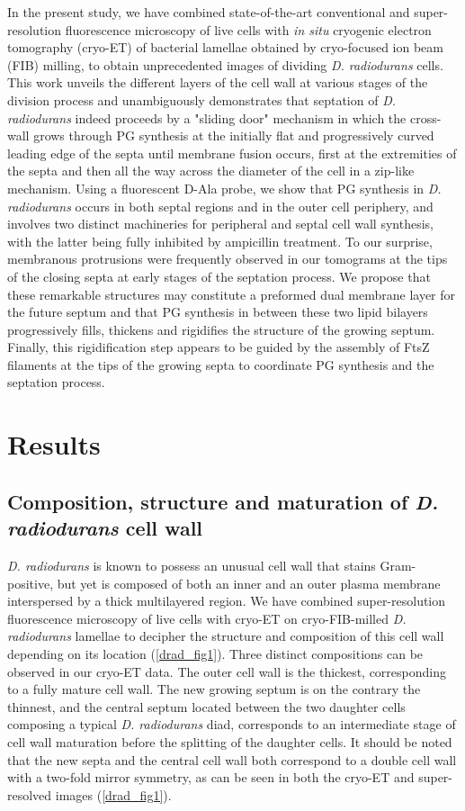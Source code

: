 In the present study, we have combined state-of-the-art conventional and super-resolution fluorescence microscopy of live cells with \textit{in situ} cryogenic electron tomography (cryo-ET) of bacterial lamellae obtained by cryo-focused ion beam (FIB) milling, to obtain unprecedented images of dividing \textit{D. radiodurans} cells.
This work unveils the different layers of the cell wall at various stages of the division process and unambiguously demonstrates that septation of \textit{D. radiodurans} indeed proceeds by a "sliding door" mechanism in which the cross-wall grows through PG synthesis at the initially flat and progressively curved leading edge of the septa until membrane fusion occurs, first at the extremities of the septa and then all the way across the diameter of the cell in a zip-like mechanism.
Using a fluorescent D-Ala probe, we show that PG synthesis in \textit{D. radiodurans} occurs in both septal regions and in the outer cell periphery, and involves two distinct machineries for peripheral and septal cell wall synthesis, with the latter being fully inhibited by ampicillin treatment.
To our surprise, membranous protrusions were frequently observed in our tomograms at the tips of the closing septa at early stages of the septation process.
We propose that these remarkable structures may constitute a preformed dual membrane layer for the future septum and that PG synthesis in between these two lipid bilayers progressively fills, thickens and rigidifies the structure of the growing septum.
Finally, this rigidification step appears to be guided by the assembly of FtsZ filaments at the tips of the growing septa to coordinate PG synthesis and the septation process.

\section{Results}

\subsection{Composition, structure and maturation of \textit{D. radiodurans} cell wall}

\textit{D. radiodurans} is known to possess an unusual cell wall that stains Gram-positive, but yet is composed of both an inner and an outer plasma membrane interspersed by a thick multilayered region.
We have combined super-resolution fluorescence microscopy of live cells with cryo-ET on cryo-FIB-milled \textit{D. radiodurans} lamellae to decipher the structure and composition of this cell wall depending on its location (\autoref{drad_fig1}).
Three distinct compositions can be observed in our cryo-ET data.
The outer cell wall is the thickest, corresponding to a fully mature cell wall.
The new growing septum is on the contrary the thinnest, and the central septum located between the two daughter cells composing a typical \textit{D. radiodurans} diad, corresponds to an intermediate stage of cell wall maturation before the splitting of the daughter cells.
It should be noted that the new septa and the central cell wall both correspond to a double cell wall with a two-fold mirror symmetry, as can be seen in both the cryo-ET and super-resolved images (\autoref{drad_fig1}).

